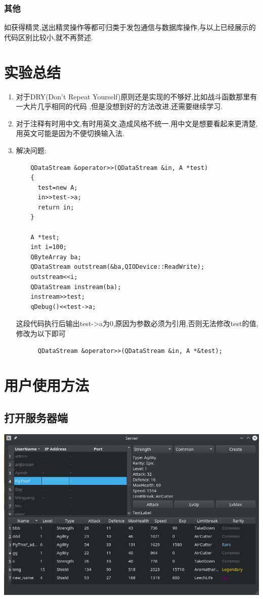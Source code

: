 \documentclass{article}
\begin{document}
  \subsubsection{其他}
  如获得精灵,送出精灵操作等都可归类于发包通信与数据库操作,与以上已经展示的代码区别比较小,就不再赘述.


\section{实验总结}
\label{sec:summry}
\begin{enumerate}
\item 对于DRY(Don't Repeat Yourself)原则还是实现的不够好,比如战斗函数那里有一大片几乎相同的代码
  ,但是没想到好的方法改进,还需要继续学习.
\item 对于注释有时用中文,有时用英文,造成风格不统一.用中文是想要看起来更清楚,用英文可能是因为不便切换输入法.
\item 解决问题:\\
  \begin{verbatim}
    QDataStream &operator>>(QDataStream &in, A *test)
    {
      test=new A;
      in>>test->a;      
      return in;
    }
    
    A *test;
    int i=100;
    QByteArray ba;
    QDataStream outstream(&ba,QIODevice::ReadWrite);
    outstream<<i;
    QDataStream instream(ba);
    instream>>test;
    qDebug()<<test->a;
  \end{verbatim}
  这段代码执行后输出test->a为0,原因为参数必须为引用,否则无法修改test的值,修改为以下即可
  \begin{verbatim}
      QDataStream &operator>>(QDataStream &in, A *&test);
  \end{verbatim}

\end{enumerate}

\section{用户使用方法}
\label{sec:information}

\subsection{打开服务器端}
\includegraphics[width=15cm]{./pokemon/服务器.png}
\end{document}
